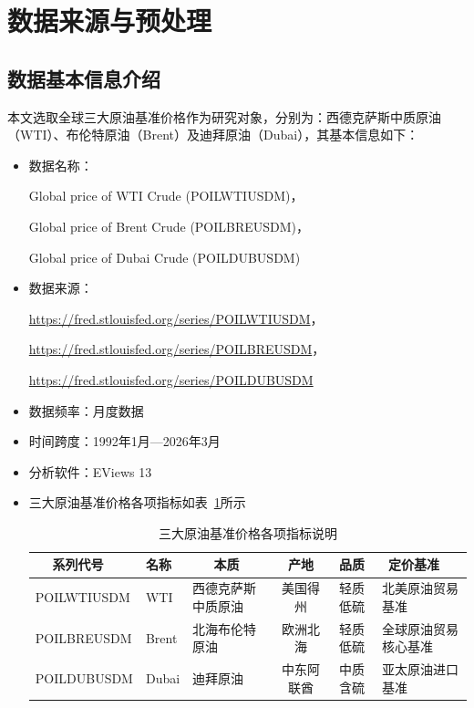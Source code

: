 \documentclass[12pt,a4paper]{ctexart}
\begin{document}
\newpage
\section{数据来源与预处理}
\subsection{数据基本信息介绍}

本文选取全球三大原油基准价格作为研究对象，分别为：西德克萨斯中质原油（WTI）、布伦特原油（Brent）及迪拜原油（Dubai），其基本信息如下：
\begin{itemize}
\item 数据名称：

Global price of WTI Crude (POILWTIUSDM)，

Global price of Brent Crude (POILBREUSDM)，

Global price of Dubai Crude (POILDUBUSDM)

\item 数据来源：

\url{https://fred.stlouisfed.org/series/POILWTIUSDM}，

\url{https://fred.stlouisfed.org/series/POILBREUSDM}，

\url{https://fred.stlouisfed.org/series/POILDUBUSDM}

\item 数据频率：月度数据

\item 时间跨度：1992年1月—2026年3月

\item 分析软件：EViews 13

\item 三大原油基准价格各项指标如表~\ref{tab:crude_oil_benchmark}所示
\begin{table}[H]
\centering
\caption{三大原油基准价格各项指标说明}
\label{tab:crude_oil_benchmark}
\begin{tabularx}{\textwidth}{l l X c c X}
\toprule
$\,\,\,\,\,\,\,\,$系列代号 & 名称 & $\quad\,\,\,\,$本质 & 产地 & 品质 & $\,\,\,$定价基准 \\
\midrule
POILWTIUSDM   & WTI     & 西德克萨斯中质原油 & 美国得州 & 轻质低硫 & 北美原油贸易基准 \\
POILBREUSDM   & Brent   & 北海布伦特原油     & 欧洲北海 & 轻质低硫 & 全球原油贸易核心基准 \\
POILDUBUSDM   & Dubai   & 迪拜原油           & 中东阿联酋 & 中质含硫 & 亚太原油进口基准 \\
\bottomrule
\end{tabularx}
\end{table}
\end{itemize}
\end{document}

